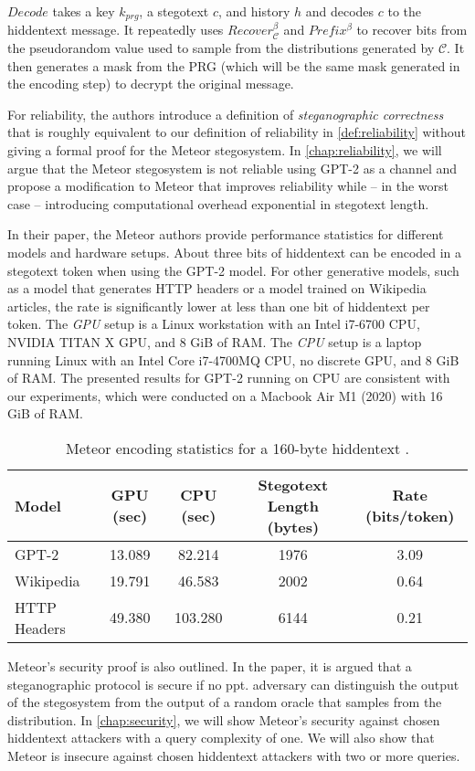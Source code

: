 $Decode$ takes a key $k_{prg}$, a stegotext $c$, and history $h$ and decodes $c$ to the hiddentext message.
It repeatedly uses $Recover_{\mathcal{C}}^\beta$ and $Prefix^\beta$ to recover bits from the pseudorandom value used to sample from the distributions generated by $\mathcal{C}$.
It then generates a mask from the PRG (which will be the same mask generated in the encoding step) to decrypt the original message.

For reliability, the authors introduce a definition of \emph{steganographic correctness} that is roughly equivalent to our definition of reliability in \autoref{def:reliability} without giving a formal proof for the Meteor stegosystem.
In \autoref{chap:reliability}, we will argue that the Meteor stegosystem is not reliable using GPT-2 as a channel and propose a modification to Meteor that improves reliability while -- in the worst case -- introducing computational overhead exponential in stegotext length.

In their paper, the Meteor authors provide performance statistics for different models and hardware setups.
About three bits of hiddentext can be encoded in a stegotext token when using the GPT-2 model.
For other generative models, such as a model that generates HTTP headers or a model trained on Wikipedia articles, the rate is significantly lower at less than one bit of hiddentext per token.
The \emph{GPU} setup is a Linux workstation with an Intel i7-6700 CPU, NVIDIA TITAN X GPU, and 8 GiB of RAM.
The \emph{CPU} setup is a laptop running Linux with an Intel Core i7-4700MQ CPU, no discrete GPU, and 8 GiB of RAM.
The presented results for GPT-2 running on CPU are consistent with our experiments, which were conducted on a Macbook Air M1 (2020) with 16 GiB of RAM.

\begin{table}[h!]
  \begin{tabular}{l||c|c|c|c}
    Model & GPU (sec) & CPU (sec) & Stegotext Length (bytes) & Rate (bits/token) \\
    \hline
    GPT-2        & 13.089 & 82.214  & 1976 & 3.09 \\
    Wikipedia    & 19.791 & 46.583  & 2002 & 0.64 \\
    HTTP Headers & 49.380 & 103.280 & 6144 & 0.21 \\
  \end{tabular}
  \caption{Meteor encoding statistics for a 160-byte hiddentext \cite{Meteor2021}.}
\end{table}

Meteor's security proof is also outlined.
In the paper, it is argued that a steganographic protocol is secure if no ppt. adversary can distinguish the output of the stegosystem from the output of a random oracle that samples from the distribution.
In \autoref{chap:security}, we will show Meteor's security against chosen hiddentext attackers with a query complexity of one.
We will also show that Meteor is insecure against chosen hiddentext attackers with two or more queries.
